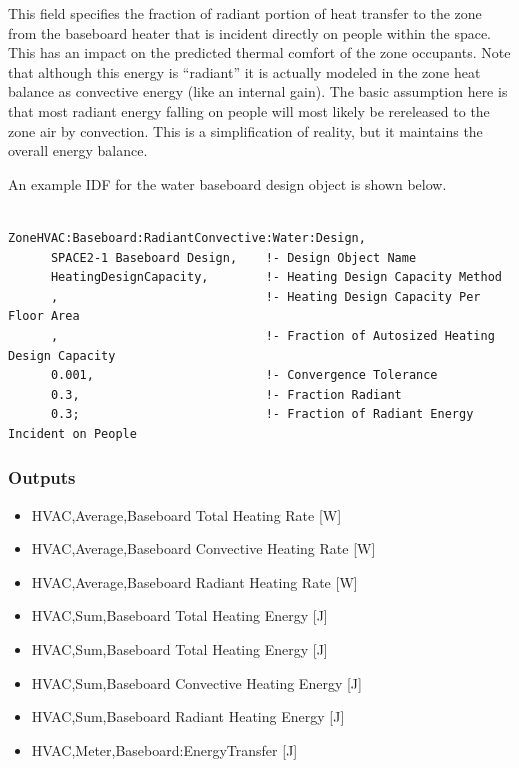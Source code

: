 This field specifies the fraction of radiant portion of heat transfer to the zone from the baseboard heater that is incident directly on people within the space. This has an impact on the predicted thermal comfort of the zone occupants. Note that although this energy is ``radiant'' it is actually modeled in the zone heat balance as convective energy (like an internal gain). The basic assumption here is that most radiant energy falling on people will most likely be rereleased to the zone air by convection. This is a simplification of reality, but it maintains the overall energy balance.

An example IDF for the water baseboard design object is shown below.

\begin{lstlisting}

ZoneHVAC:Baseboard:RadiantConvective:Water:Design,
      SPACE2-1 Baseboard Design,    !- Design Object Name
      HeatingDesignCapacity,        !- Heating Design Capacity Method
      ,                             !- Heating Design Capacity Per Floor Area
      ,                             !- Fraction of Autosized Heating Design Capacity
      0.001,                        !- Convergence Tolerance
      0.3,                          !- Fraction Radiant
      0.3;                          !- Fraction of Radiant Energy Incident on People

\end{lstlisting}

\subsubsection{Outputs}\label{outputs-027}

\begin{itemize}
\item
  HVAC,Average,Baseboard Total Heating Rate {[}W{]}
\item
  HVAC,Average,Baseboard Convective Heating Rate {[}W{]}
\item
  HVAC,Average,Baseboard Radiant Heating Rate {[}W{]}
\item
  HVAC,Sum,Baseboard Total Heating Energy {[}J{]}
\item
  HVAC,Sum,Baseboard Total Heating Energy {[}J{]}
\item
  HVAC,Sum,Baseboard Convective Heating Energy {[}J{]}
\item
  HVAC,Sum,Baseboard Radiant Heating Energy {[}J{]}
\item
  HVAC,Meter,Baseboard:EnergyTransfer {[}J{]}
\end{itemize}

